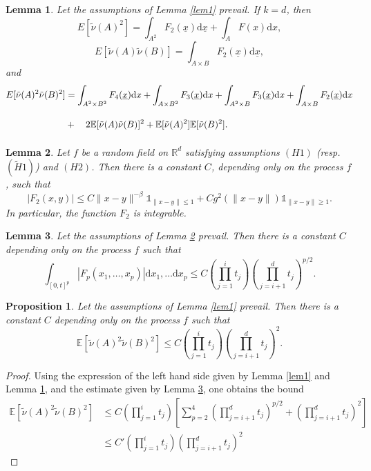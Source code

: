 \documentclass[10pt,a4paper]{amsart}
\newtheorem{lemma}{Lemma}
\newtheorem{proposition}{Proposition}
\newcommand\E{\mathbb{E}}
\newcommand\R{\mathbb{R}}
\newcommand\dd{\mathrm{d}}
\newcommand\nut{\tilde{\nu}}
\newcommand\one{\mathds{1}}
\newcommand\x{\underline{x}}
\begin{document}
\begin{lemma}
\label{lem2} Let the assumptions of Lemma \ref{lem1} prevail. If $k=d$, then
\[E[\nut(A)^2] = \int_{A^2}F_2(\x)\dd \x + \int_{A}F(x)\dd x,\]
\[E[\nut(A)\nut(B)] = \int_{A\times B} F_2(\x)\dd \x,\]
and
\begin{align*}
E[\nut(A)^2\nut(B)^2] &= \int_{A^2\times B^2}F_4(\x)\dd x + \int_{A\times B^2}F_3(\x)\dd x + \int_{A^2\times B}F_3(\x)\dd x + \int_{A\times B}F_2(\x)\dd x\\
&+\vphantom{\int^{\int}}\quad 2\E[\nut(A)\nut(B)]^2 + \E[\nut(A)^2]\E[\nut(B)^2].
\end{align*}
\end{lemma}

\begin{lemma}
\label{lem3}
Let $f$ be a random field on $\R^d$ satisfying assumptions  $(H1)$ (resp. $(\widetilde{H}1)$) and $(H2)$. Then there is a constant $C$, depending only on the process $f$, such that
\[|F_2(x,y)|\leq C\|x-y\|^{-\beta}\one_{\|x-y\|\leq 1} + Cg^2(\|x-y\|)\one_{\|x-y\|\geq 1}.\]
In particular, the function $F_2$ is integrable.
\end{lemma}

\begin{lemma}
\label{lem4}
 Let the assumptions of Lemma \ref{lem3} prevail. Then there is a constant $C$ depending only on the process $f$ such that
\[\int_{[0,t]^p} |F_p(x_1,\ldots,x_p)|\dd x_1,\ldots\dd x_p\leq C\left(\prod_{j=1}^i t_j\right)\left(\prod_{j=i+1}^d t_j\right)^{p/2}.\]\end{lemma}

\begin{proposition}
\label{prop2} Let the assumptions of Lemma \ref{lem1} prevail. Then there is a constant $C$ depending only on the process $f$ such that
\[\E[\nut(A)^2\nut(B)^2]\leq C\left(\prod_{j=1}^i t_j\right)\left(\prod_{j=i+1}^d t_j\right)^2.\]
\end{proposition}

\begin{proof}
Using the expression of the left hand side given by Lemma \ref{lem1} and Lemma \ref{lem2}, and the estimate given by Lemma \ref{lem4}, one obtains the bound
\begin{align*}
\E[\nut(A)^2\nut(B)^2]&\leq C\left(\prod_{j=1}^i t_j\right)\left[\sum_{p=2}^4 \left(\prod_{j=i+1}^d t_j\right)^{p/2} + \left(\prod_{j=i+1}^d t_j\right)^2\right]\\
&\leq C'\left(\prod_{j=1}^i t_j\right)\left(\prod_{j=i+1}^d t_j\right)^2
\end{align*}
\end{proof}
\end{document}
